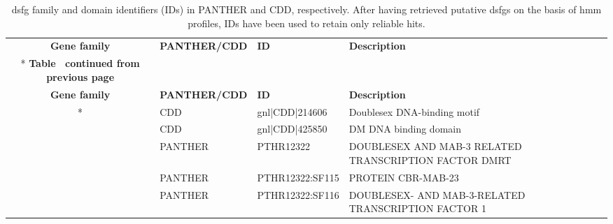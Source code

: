 \documentclass[../main.tex]{subfiles}
\begin{document}
\begin{landscape}
	\tiny
	\begin{longtable}{@{}cllll@{}}
		\caption{\gls{dsfg} family and domain identifiers (IDs) in PANTHER and CDD, respectively. After having retrieved putative \glspl{dsfg} on the basis of \gls{hmm} profiles, IDs have been used to retain only reliable hits.}
		\label{suppTab:panther_cdd}                                                                                                                                                                                               \\
		\toprule
		\textbf{Gene family}            & \textbf{PANTHER/CDD} & \textbf{ID}     & \textbf{Description}                                                                                                                         & \\* \midrule \midrule
		\endfirsthead
		\multicolumn{5}{c}%
		{{\bfseries Table \thetable\ continued from previous page}}                                                                                                                                                               \\
		\toprule
		\textbf{Gene family}            & \textbf{PANTHER/CDD} & \textbf{ID}     & \textbf{Description}                                                                                                                         & \\* \midrule \midrule
		\endhead
		\multirow{11}{*}{\textbf{Dmrt}} & CDD                  & gnl|CDD|214606  & Doublesex DNA-binding motif                                                                                                                  & \\
		                                & CDD                  & gnl|CDD|425850  & DM DNA binding domain                                                                                                                        & \\
		                                & PANTHER              & PTHR12322       & DOUBLESEX AND MAB-3 RELATED TRANSCRIPTION FACTOR  DMRT                                                                                       & \\
		                                & PANTHER              & PTHR12322:SF115 & PROTEIN CBR-MAB-23                                                                                                                           & \\
		                                & PANTHER              & PTHR12322:SF116 & DOUBLESEX- AND MAB-3-RELATED TRANSCRIPTION FACTOR 1                                                                                          & \\

\end{longtable}
\end{landscape}
\end{document}
